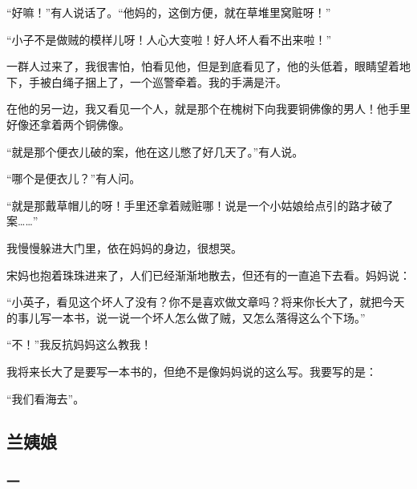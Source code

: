 \par “好嘛！”有人说话了。“他妈的，这倒方便，就在草堆里窝赃呀！”
\par “小子不是做贼的模样儿呀！人心大变啦！好人坏人看不出来啦！”
\par 一群人过来了，我很害怕，怕看见他，但是到底看见了，他的头低着，眼睛望着地下，手被白绳子捆上了，一个巡警牵着。我的手满是汗。
\par 在他的另一边，我又看见一个人，就是那个在槐树下向我要铜佛像的男人！他手里好像还拿着两个铜佛像。
\par “就是那个便衣儿破的案，他在这儿憋了好几天了。”有人说。
\par “哪个是便衣儿？”有人问。
\par “就是那戴草帽儿的呀！手里还拿着贼赃哪！说是一个小姑娘给点引的路才破了案……”
\par 我慢慢躲进大门里，依在妈妈的身边，很想哭。
\par 宋妈也抱着珠珠进来了，人们已经渐渐地散去，但还有的一直追下去看。妈妈说：
\par “小英子，看见这个坏人了没有？你不是喜欢做文章吗？将来你长大了，就把今天的事儿写一本书，说一说一个坏人怎么做了贼，又怎么落得这么个下场。”
\par “不！”我反抗妈妈这么教我！
\par 我将来长大了是要写一本书的，但绝不是像妈妈说的这么写。我要写的是：
\par “我们看海去”。













\subsection{兰姨娘}






\subsubsection*{一}


